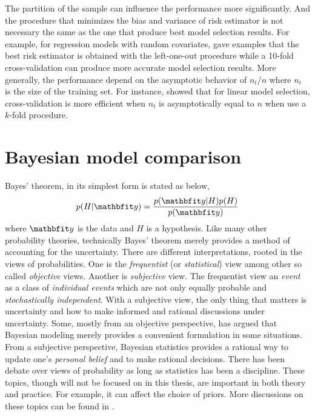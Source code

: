 The partition of the sample can influence the performance more significantly.
And the procedure that minimizes the bias and variance of risk estimator is
not necessary the same as the one that produce best model selection results.
For example, for regression models with random covariates,
\cite{Breiman:1992vx} gave examples that the best risk estimator is obtained
with the left-one-out procedure while a 10-fold cross-validation can produce
more accurate model selection results. More generally, the performance
depend on the asymptotic behavior of $n_t/n$ where $n_t$ is the size of the
training set. For instance, \cite{Shao:1997vx} showed that for linear model
selection, cross-validation is more efficient when $n_t$ is asymptotically
equal to $n$ when use a $k$-fold procedure.

\section{Bayesian model comparison}
\label{sec:Bayesian model comparison}

Bayes' theorem, in its simplest form is stated as below,
\begin{equation}
  p(H|\data) = \frac{p(\data|H)p(H)}{p(\data)} \label{eq:bayes}
\end{equation}
where $\data$ is the data and $H$ is a hypothesis. Like many other probability
theories, technically Bayes' theorem merely provides a method of accounting
for the uncertainty. There are different interpretations, rooted in the views
of probabilities. One is the \emph{frequentist} (or \emph{statistical}) view
among other so called \emph{objective} views. Another is \emph{subjective}
view. The frequentist view an \emph{event} as a class of \emph{individual
  events} which are not only equally probable and \emph{stochastically
  independent}. With a subjective view, the only thing that matters is
uncertainty and how to make informed and rational discussions under
uncertainty. Some, mostly from an objective perspective, has argued that
Bayesian modeling merely provides a convenient formulation in some situations.
From a subjective perspective, Bayesian statistics provides a rational way to
update one's \emph{personal belief} and to make rational decisions. There has
been debate over views of probability as long as statistics has been a
discipline. These topics, though will not be focused on in this thesis, are
important in both theory and practice. For example, it can affect the choice
of priors. More discussions on these topics can be found in
\cite[][chap.~1]{Bernardo:1994vd}.

